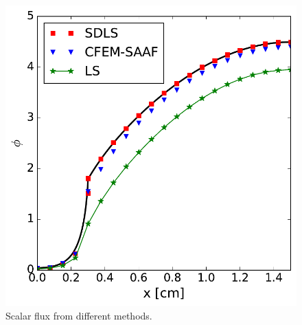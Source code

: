 \documentclass[review]{elsarticle}
\begin{document}
\begin{figure}[ht!]
	\begin{center}
		\includegraphics[width=.7\textwidth]{eigen-flx}
		\caption[]{Scalar flux from different methods.}%
		\label{f:eigen-flx}
	\end{center}
\end{figure}
\end{document}
